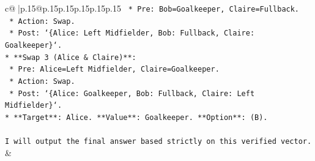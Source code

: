 \documentclass{article}
\begin{document}
{\begin{supertabular}{c@{$\;$}|p{.15\linewidth}@{}p{.15\linewidth}p{.15\linewidth}p{.15\linewidth}p{.15\linewidth}p{.15\linewidth}}
{{{\texttt{    *   Pre: Bob=Goalkeeper, Claire=Fullback.} \\
\texttt{    *   Action: Swap.} \\
\texttt{    *   Post: `\{Alice: Left Midfielder, Bob: Fullback, Claire: Goalkeeper\}`.} \\
\texttt{*   **Swap 3 (Alice \& Claire)**:} \\
\texttt{    *   Pre: Alice=Left Midfielder, Claire=Goalkeeper.} \\
\texttt{    *   Action: Swap.} \\
\texttt{    *   Post: `\{Alice: Goalkeeper, Bob: Fullback, Claire: Left Midfielder\}`.} \\
\texttt{*   **Target**: Alice. **Value**: Goalkeeper. **Option**: (B).} \\
\\ 
\texttt{I will output the final answer based strictly on this verified vector.} \\
            }
        }
    }
    & \\ \\

\end{supertabular}
}
\end{document}
